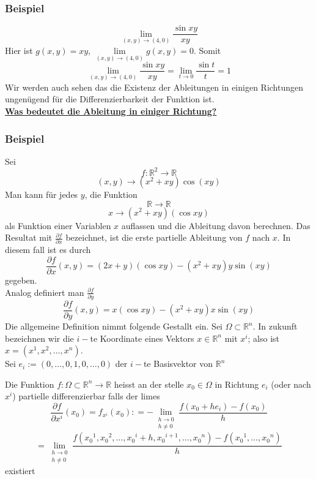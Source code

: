 \subsubsection*{Beispiel}
\[\mathop {\lim }\limits_{(x,y) \to (4,0)} \frac{{\sin xy}}{{xy}}\] Hier ist $g(x,y)=xy$, $\mathop {\lim }\limits_{(x,y) \to (4,0)} g(x,y) = 0$. Somit \[\mathop {\lim }\limits_{(x,y) \to (4,0)} \frac{{\sin xy}}{{xy}} = \mathop {\lim }\limits_{t \to 0} \frac{{\sin t}}{t} = 1\] Wir werden auch sehen das die Existenz der Ableitungen in einigen Richtungen ungenügend für die Differenzierbarkeit der Funktion ist. \\

\noindent\textbf{\underline{Was bedeutet die Ableitung in einiger Richtung?}}
\subsubsection*{Beispiel}
Sei $$f:\mathbb{R}^2\rightarrow \mathbb{R}$$$$(x,y)\rightarrow \left(x^2+xy\right)\cos(xy)$$Man kann für jedes $y$, die Funktion $$\mathbb{R}\rightarrow\mathbb{R}$$$$x\rightarrow \left( x^2+xy\right)\left(\cos xy\right)$$als Funktion einer Variablen $x$ auflassen und die Ableitung davon berechnen. Das Resultat mit $\frac{\partial f}{\partial x}$ bezeichnet, ist die erste partielle Ableitung von $f$ nach $x$. In diesem fall ist es durch \[\frac{{\partial f}}{{\partial x}}(x,y) = (2x + y)(\cos xy) - ({x^2} + xy)y\sin (xy)\] gegeben. \\

\noindent Analog definiert man $\frac{\partial f}{\partial y}$\[\frac{{\partial f}}{{\partial y}}(x,y) = x(\cos xy) - ({x^2} + xy)x\sin (xy)\] Die allgemeine Definition nimmt folgende Gestallt ein. Sei $\Omega \subset\mathbb{R}^n$. In zukunft  bezeichnen wir die $i-$te Koordinate eines Vektors $x\in\mathbb{R}^n$ mit $x^i$; also ist $x=\left( x^1,x^2,\dots,x^n\right)$.\\

\noindent Sei $e_i:=\left( 0,\dots,0,1,0,\dots,0\right)$ der $i-$te Basisvektor von $\mathbb{R}^n$

\begin{definition}{8.2}
Die Funktion $f:\Omega\subset\mathbb{R}^n\rightarrow\mathbb{R}$ heisst an der stelle $x_0\in\Omega$ in Richtung $e_i$ (oder nach $x^i$) partielle differenzierbar falls der limes \[\frac{{\partial f}}{{\partial {x^i}}}({x_0}) = {f_{{x^i}}}({x_0}): =  - \mathop {\lim }\limits_{\begin{array}{*{20}{c}}
{h \to 0}\\
{h\not  = 0}
\end{array}} \frac{{f({x_0} + h{e_i}) - f({x_0})}}{h}\]
\[ = \mathop {\lim }\limits_{\begin{array}{*{20}{c}}
{h \to 0}\\
{h\not  = 0}
\end{array}} \frac{{f\left( {{x_0}^1,{x_0}^2, \ldots ,{x_0}^i + h,{x_0}^{i + 1}, \ldots ,{x_0}^n} \right) - f\left( {{x_0}^1, \ldots ,{x_0}^n} \right)}}{h}\]
existiert
\end{definition}
